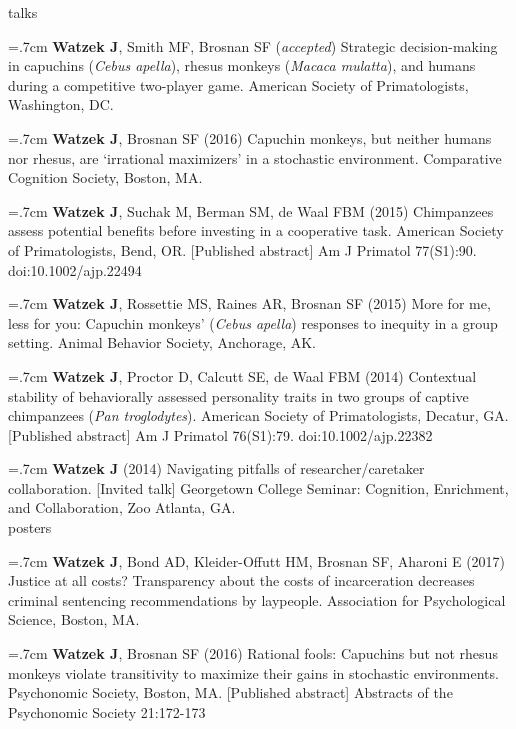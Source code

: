 \documentclass[]{friggeri-cv}
\begin{document}

{\subfont\large{} talks}

\hangindent=.7cm \textbf{Watzek J}, Smith MF, Brosnan SF (\emph{accepted}) Strategic decision-making in capuchins (\emph{Cebus apella}), rhesus monkeys (\emph{Macaca mulatta}), and humans during a competitive two-player game. American Society of Primatologists, Washington, DC.

\hangindent=.7cm \textbf{Watzek J}, Brosnan SF (2016) Capuchin monkeys, but neither humans nor rhesus, are `irrational maximizers' in a stochastic environment. Comparative Cognition Society, Boston, MA.

\hangindent=.7cm \textbf{Watzek J}, Suchak M, Berman SM, de Waal FBM (2015) Chimpanzees assess potential benefits before investing in a cooperative task. American Society of Primatologists, Bend, OR. [Published abstract] Am J Primatol 77(S1):90. doi:10.1002/ajp.22494

\hangindent=.7cm \textbf{Watzek J}, Rossettie MS, Raines AR, Brosnan SF (2015) More for me, less for you: Capuchin monkeys' (\emph{Cebus apella}) responses to inequity in a group setting. Animal Behavior Society, Anchorage, AK.

\hangindent=.7cm \textbf{Watzek J}, Proctor D, Calcutt SE, de Waal FBM (2014) Contextual stability of behaviorally assessed personality traits in two groups of captive chimpanzees (\emph{Pan troglodytes}). American Society of Primatologists, Decatur, GA. [Published abstract] Am J Primatol 76(S1):79. doi:10.1002/ajp.22382

\hangindent=.7cm \textbf{Watzek J} (2014) Navigating pitfalls of researcher/caretaker collaboration. [Invited talk] Georgetown College Seminar: Cognition, Enrichment, and Collaboration, Zoo Atlanta, GA.\\[.5cm]


{\subfont\large{} posters}

\hangindent=.7cm \textbf{Watzek J}, Bond AD, Kleider-Offutt HM, Brosnan SF, Aharoni E (2017) Justice at all costs? Transparency about the costs of incarceration decreases criminal sentencing recommendations by laypeople. Association for Psychological Science, Boston, MA.

\hangindent=.7cm \textbf{Watzek J}, Brosnan SF (2016) Rational fools: Capuchins but not rhesus monkeys violate transitivity to maximize their gains in stochastic environments. Psychonomic Society, Boston, MA. [Published abstract] Abstracts of the Psychonomic Society 21:172-173
\end{document}
